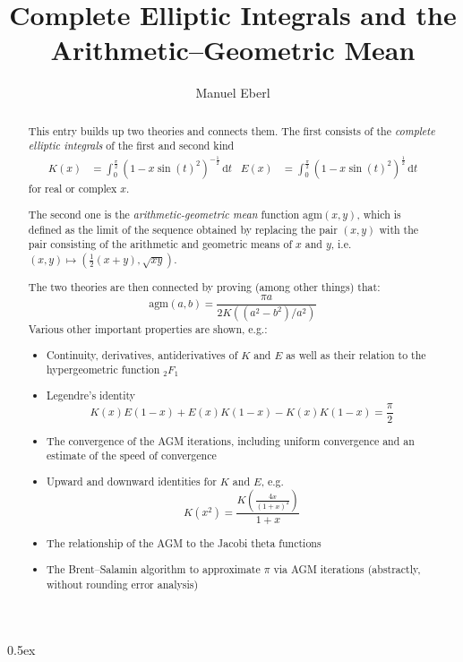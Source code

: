 \documentclass[11pt,a4paper]{article}
\begin{document}
\title{Complete Elliptic Integrals and the Arithmetic--Geometric Mean}
\author{Manuel Eberl}
\maketitle

\begin{abstract}
This entry builds up two theories and connects them. The first consists of the \emph{complete elliptic integrals} of the first and second kind
\begin{align*}
K(x) &= \int_0^{\frac{\pi}{2}} (1-x \sin(t)^2)^{-\frac{1}{2}}\,\text{d}t &
E(x) &= \int_0^{\frac{\pi}{2}} (1-x \sin(t)^2)^{\frac{1}{2}}\,\text{d}t
\end{align*}
for real or complex $x$.

The second one is the \emph{arithmetic-geometric mean} function $\text{agm}(x,y)$, which is defined as the limit of the sequence obtained by replacing the pair $(x,y)$ with the pair consisting of the arithmetic and geometric means of $x$ and $y$, i.e.\ $(x,y)\mapsto (\frac{1}{2}(x+y), \sqrt{xy})$.

The two theories are then connected by proving (among other things) that:
\[\text{agm}(a,b) = \frac{\pi a}{2K((a^2-b^2)/a^2)}\]
Various other important properties are shown, e.g.:
\begin{itemize}
\item Continuity, derivatives, antiderivatives of $K$ and $E$ as well as their relation to the hypergeometric function ${}_2 F_{1}$
\item Legendre's identity \[K(x) E(1-x) + E(x) K(1-x) - K(x) K(1-x) = \frac{\pi}{2}\]
\item The convergence of the AGM iterations, including uniform convergence and an estimate of the speed of convergence
\item Upward and downward identities for $K$ and $E$, e.g.\ \[K(x^2) = \frac{K\left(\frac{4x}{(1+x)^2}\right)}{1+x}\]
\item The relationship of the AGM to the Jacobi theta functions
\item The Brent--Salamin algorithm to approximate $\pi$ via AGM iterations (abstractly, without rounding error analysis)
\end{itemize}
\end{abstract}

\tableofcontents

\newpage
\parindent 0pt\parskip 0.5ex



\raggedright
\nocite{borwein}
\nocite{brent}



\end{document}

